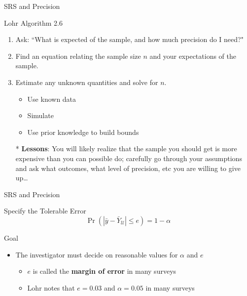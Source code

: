 \documentclass[10pt]{beamer}\usepackage[]{graphicx}\usepackage[]{xcolor}
\begin{document}
\begin{frame}{SRS and Precision}

\begin{block}{Lohr Algorithm 2.6}
\begin{enumerate}
\item Ask: ``What is expected of the sample, and how much precision do I need?"
\item Find an equation relating the sample size $n$ and your expectations of the sample.
\item Estimate any unknown quantities and solve for $n$. 
\begin{itemize}
\item Use known data
\item Simulate
\item Use prior knowledge to build bounds
\end{itemize}
\item[*]\textbf{Lessons}: You will likely realize that the sample you should get is more expensive than you can possible do; carefully go through your assumptions and ask what outcomes, what level of precision, etc you are willing to give up\dots
\end{enumerate}
\end{block}

\end{frame}

\begin{frame}{SRS and Precision}
\begin{block}{Specify the Tolerable Error}
$$\Pr(|\bar{y}-\bar{Y}_{\mathcal{U}}| \leq e) = 1-\alpha$$
\end{block}

\begin{block}{Goal}
\begin{itemize}
\item The investigator must decide on reasonable values for $\alpha$ and $e$

\begin{itemize}
\item $e$ is called the \textbf{margin of error} in many surveys
\item Lohr notes that $e=0.03$ and $\alpha=0.05$ in many surveys
\end{itemize}

\end{itemize}
\end{block}

\end{frame}
\end{document}

